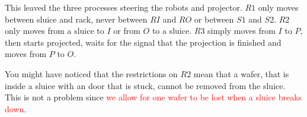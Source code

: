 This leaved the three processes steering the robots and projector. $R1$ only moves between sluice and rack, never between $RI$ and $RO$ or between $S1$ and $S2$. $R2$ only moves from a sluice to $I$ or from $O$ to a sluice. $R3$ simply moves from $I$ to $P$, then starts projected, waits for the signal that the projection is finished and moves from $P$ to $O$.

You might have noticed that the restrictions on $R2$ mean that a wafer, that is inside a sluice with an door that is stuck, cannot be removed from the sluice. This is not a problem since \textcolor{red}{we allow for one wafer to be lost when a sluice breaks down}.